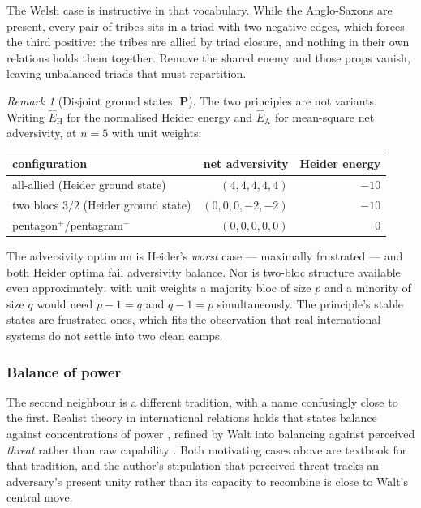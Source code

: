 \documentclass[11pt]{article}
\numberwithin{equation}{section}
\theoremstyle{plain}
\theoremstyle{definition}
\theoremstyle{remark}
\newtheorem{remark}[theorem]{Remark}
\begin{document}
The Welsh case is instructive in that vocabulary. While the
Anglo-Saxons are present, every pair of tribes sits in a triad with two
negative edges, which forces the third positive: the tribes are allied
by triad closure, and nothing in their own relations holds them
together. Remove the shared enemy and those props vanish, leaving
unbalanced triads that must repartition.

\begin{remark}[Disjoint ground states; \textbf{P}]
\label{ad:rem:disjoint}
The two principles are not variants. Writing $\hat E_{\mathrm H}$ for
the normalised Heider energy and $\hat E_{\mathrm A}$ for mean-square
net adversivity, at $n=5$ with unit weights:
\begin{center}\small
\begin{tabular}{@{}lrr@{}}
\toprule
configuration & net adversivity & Heider energy\\
\midrule
all-allied (Heider ground state) & $(4,4,4,4,4)$ & $-10$\\
two blocs $3/2$ (Heider ground state) & $(0,0,0,-2,-2)$ & $-10$\\
pentagon$^{+}$/pentagram$^{-}$ & $(0,0,0,0,0)$ & $0$\\
\bottomrule
\end{tabular}
\end{center}
The adversivity optimum is Heider's \emph{worst} case --- maximally
frustrated --- and both Heider optima fail adversivity balance. Nor is
two-bloc structure available even approximately: with unit weights a
majority bloc of size $p$ and a minority of size $q$ would need
$p-1=q$ and $q-1=p$ simultaneously. The principle's stable states are
frustrated ones, which fits the observation that real international
systems do not settle into two clean camps.
\end{remark}

\subsubsection{Balance of power}\label{ad:subsub:realism}

The second neighbour is a different tradition, with a name confusingly
close to the first. Realist theory in international relations holds
that states balance against concentrations of power \cite{Wal79},
refined by Walt into balancing against perceived \emph{threat} rather
than raw capability \cite{Wal87}. Both motivating cases above are textbook for
that tradition, and the author's stipulation that perceived threat
tracks an adversary's present unity rather than its capacity to
recombine is close to Walt's central move.
\end{document}
